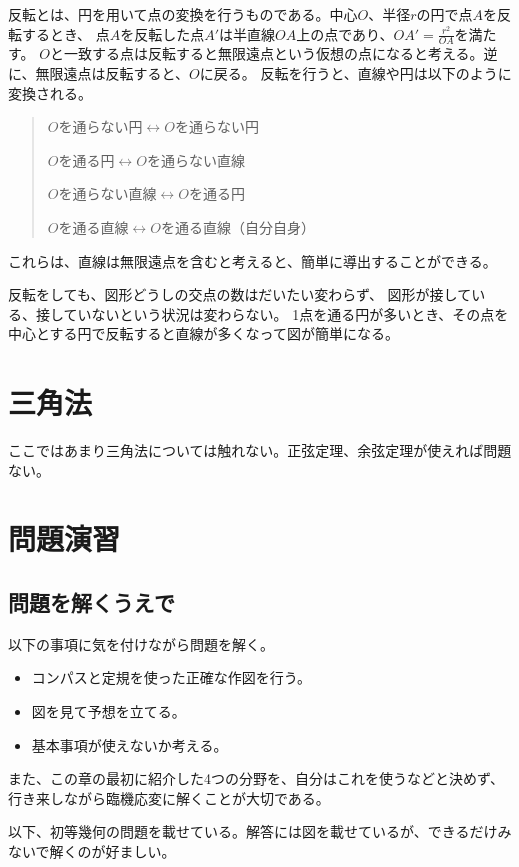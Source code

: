 \documentclass[uplatex,fleqn]{jsbook}
\begin{document}
反転とは、円を用いて点の変換を行うものである。中心$O$、半径$r$の円で点$A$を反転するとき、
点$A$を反転した点$A'$は半直線$OA$上の点であり、$\displaystyle OA'=\frac{r^2}{OA}$を満たす。
$O$と一致する点は反転すると無限遠点という仮想の点になると考える。逆に、無限遠点は反転すると、$O$に戻る。
反転を行うと、直線や円は以下のように変換される。
\begin{quote}
    $O$を通らない円$\leftrightarrow$$O$を通らない円

    $O$を通る円$\leftrightarrow$$O$を通らない直線

    $O$を通らない直線$\leftrightarrow$$O$を通る円

    $O$を通る直線$\leftrightarrow$$O$を通る直線（自分自身）
\end{quote}
これらは、直線は無限遠点を含むと考えると、簡単に導出することができる。

反転をしても、図形どうしの交点の数はだいたい変わらず、
図形が接している、接していないという状況は変わらない。
1点を通る円が多いとき、その点を中心とする円で反転すると直線が多くなって図が簡単になる。

\section{三角法}
ここではあまり三角法については触れない。正弦定理、余弦定理が使えれば問題ない。

\section{問題演習}
\subsection{問題を解くうえで}
以下の事項に気を付けながら問題を解く。
\begin{itemize}
    \item コンパスと定規を使った正確な作図を行う。
    \item 図を見て予想を立てる。
    \item 基本事項が使えないか考える。
\end{itemize}
また、この章の最初に紹介した4つの分野を、自分はこれを使うなどと決めず、行き来しながら臨機応変に解くことが大切である。

以下、初等幾何の問題を載せている。解答には図を載せているが、できるだけみないで解くのが好ましい。
\end{document}
